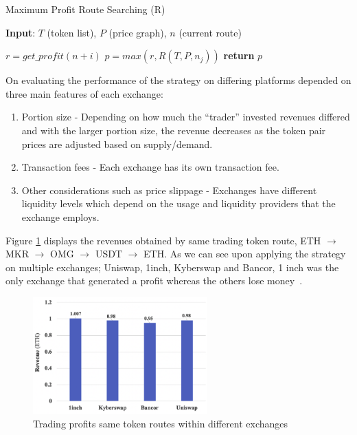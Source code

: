 \begin{algorithm}
    \caption{Maximum Profit Route Searching (R)}\label{alg:arb_sys_on_dex}
    \textbf{Input}: $T$ (token list), $P$ (price graph), $n$ (current route)
    \begin{algorithmic}
        \State $r = get\_profit(n+i)$
        \State $p = max(r, R(T, P, n_j))$
        \EndFor
        \EndFor
        \State \textbf{return} $p$
    \end{algorithmic}
\end{algorithm}

\noindent On evaluating the performance of the strategy on differing platforms depended on three main features of each exchange:
\begin{enumerate}
    \item Portion size - Depending on how much the ``trader'' invested revenues differed and with the larger portion size, the revenue decreases as the token pair prices are adjusted based on supply/demand.
    \item Transaction fees - Each exchange has its own transaction fee.
    \item Other considerations such as price slippage - Exchanges have different liquidity levels which depend on the usage and liquidity providers that the exchange employs.
\end{enumerate}

\noindent Figure \ref{fig:arb_on_diff_exchanges} displays the revenues obtained by same trading token route, ETH $\rightarrow$ MKR $\rightarrow$ OMG $\rightarrow$ USDT $\rightarrow$ ETH. As we can see upon applying the strategy on multiple exchanges; Uniswap, 1inch, Kyberswap and Bancor, 1 inch was the only exchange that generated a profit whereas the others lose money~\cite{boonpeam2021arbitrage}. 
\\[5mm]
\begin{figure}[!htb]
    \centering
    \includegraphics[width=0.6\textwidth]{background/Images/revenue_oncyclic_arb.png}
    \caption{Trading profits same token routes within different exchanges~\cite{boonpeam2021arbitrage} \label{fig:arb_on_diff_exchanges}}
\end{figure}

